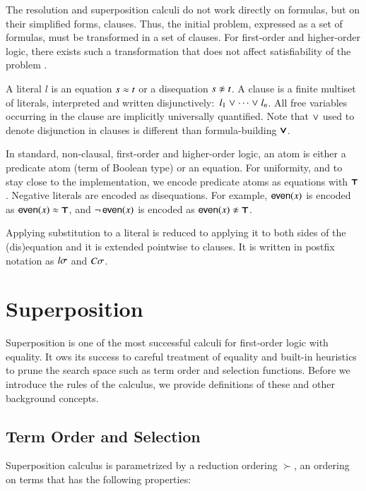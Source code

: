 The resolution and superposition calculi do not work directly on formulas, but
on their simplified forms, clauses. Thus, the initial problem, expressed as a
set of formulas, must be transformed in a set of clauses. For first-order and
higher-order logic, there exists such a transformation that does not affect
satisfiability of the problem \cite{nw-01-small-cnf}.

A literal $l$ is an equation $s \approx t$ or a disequation $s \noteq t$. A clause is a
finite multiset of literals, interpreted and written disjunctively:\ $l_1 \mathrel\lor
\cdots \mathrel\lor l_n$. All free variables occurring in the clause are implicitly
universally quantified. Note that $\mathrel\lor$ used to denote disjunction in clauses
is different than formula-building $\pmb\lor$.

In standard, non-clausal, first-order and higher-order logic, an atom  is either
a predicate atom (term of Boolean type) or an equation. For uniformity, and to
stay close to the implementation, we encode predicate atoms as equations with
$\pmb\top$. Negative literals are encoded as disequations. For example,
$\mathsf{even}(x)$ is encoded as $\mathsf{even}(x) \approx \pmb\top$, and
$\neg\,\mathsf{even}(x)$ is encoded as $\neglit{\cst{even}(x)}$. 

Applying substitution to a literal is reduced to applying it to both sides of
the (dis)equa\-tion and it is extended pointwise to clauses. It is written in postfix notation
as $l\sigma$ and $C\sigma$.

\section{Superposition}

Superposition is one of the most successful calculi for first-order logic with
equality. It ows its success to careful treatment of equality and built-in
heuristics to prune the search space such as term order and selection functions.
Before we introduce the rules of the calculus, we provide definitions of these and other
background concepts.

\subsection{Term Order and Selection}

Superposition calculus is parametrized by a reduction ordering $\succ$, an
ordering on terms that has the following properties:

